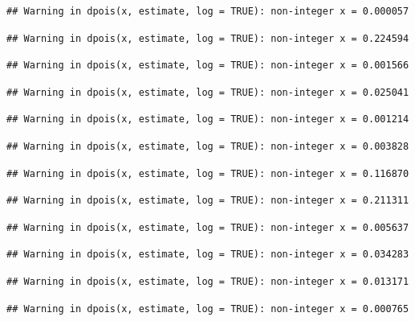 \documentclass[]{article}
\begin{document}
\begin{verbatim}
## Warning in dpois(x, estimate, log = TRUE): non-integer x = 0.000057
\end{verbatim}

\begin{verbatim}
## Warning in dpois(x, estimate, log = TRUE): non-integer x = 0.224594
\end{verbatim}

\begin{verbatim}
## Warning in dpois(x, estimate, log = TRUE): non-integer x = 0.001566
\end{verbatim}

\begin{verbatim}
## Warning in dpois(x, estimate, log = TRUE): non-integer x = 0.025041
\end{verbatim}

\begin{verbatim}
## Warning in dpois(x, estimate, log = TRUE): non-integer x = 0.001214
\end{verbatim}

\begin{verbatim}
## Warning in dpois(x, estimate, log = TRUE): non-integer x = 0.003828
\end{verbatim}

\begin{verbatim}
## Warning in dpois(x, estimate, log = TRUE): non-integer x = 0.116870
\end{verbatim}

\begin{verbatim}
## Warning in dpois(x, estimate, log = TRUE): non-integer x = 0.211311
\end{verbatim}

\begin{verbatim}
## Warning in dpois(x, estimate, log = TRUE): non-integer x = 0.005637
\end{verbatim}

\begin{verbatim}
## Warning in dpois(x, estimate, log = TRUE): non-integer x = 0.034283
\end{verbatim}

\begin{verbatim}
## Warning in dpois(x, estimate, log = TRUE): non-integer x = 0.013171
\end{verbatim}

\begin{verbatim}
## Warning in dpois(x, estimate, log = TRUE): non-integer x = 0.000765
\end{verbatim}
\end{document}
